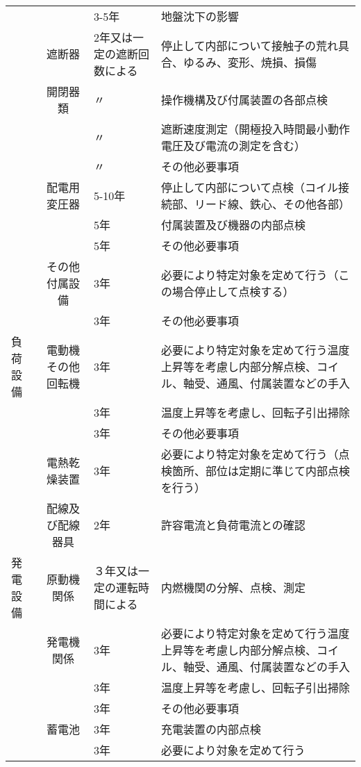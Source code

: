 \documentclass[10pt,a4paper,uplatex]{jsarticle}
\begin{document}
\begin{table}[b]
\begin{tabular}{|l|c|p{1cm}|p{10cm}|}
    &              & 3-5年 & 地盤沈下の影響  \\ \cline{2-4}
    &遮断器         & 2年又は一定の遮断回数による & 停止して内部について接触子の荒れ具合、ゆるみ、変形、焼損、損傷  \\ 
    &開閉器類       & 〃    & 操作機構及び付属装置の各部点検  \\
    &              & 〃    & 遮断速度測定（開極投入時間最小動作電圧及び電流の測定を含む）  \\
    &              & 〃    & その他必要事項  \\ \cline{2-4}
    &配電用変圧器   & 5-10年 & 停止して内部について点検（コイル接続部、リード線、鉄心、その他各部）  \\
    &              & 5年 & 付属装置及び機器の内部点検  \\ 
    &              & 5年 & その他必要事項  \\ \cline{2-4}
    &その他付属設備 & 3年 & 必要により特定対象を定めて行う（この場合停止して点検する）  \\
    &              & 3年 & その他必要事項  \\ \cline{2-4}
    \hline 
負荷設備
    &電動機その他回転機& 3年 & 必要により特定対象を定めて行う温度上昇等を考慮し内部分解点検、コイル、軸受、通風、付属装置などの手入  \\
    &              & 3年 & 温度上昇等を考慮し、回転子引出掃除  \\
    &              & 3年 & その他必要事項  \\ \cline{2-4}
    &電熱乾燥装置     & 3年 & 必要により特定対象を定めて行う（点検箇所、部位は定期に準じて内部点検を行う）  \\\cline{2-4}
    &配線及び配線器具   & 2年 & 許容電流と負荷電流との確認\\ \cline{2-4}
    \hline  
発電設備
    &原動機関係     & ３年又は一定の運転時間による & 内燃機関の分解、点検、測定  \\\cline{2-4}
    &発電機関係     & 3年 & 必要により特定対象を定めて行う温度上昇等を考慮し内部分解点検、コイル、軸受、通風、付属装置などの手入  \\
    &              & 3年 & 温度上昇等を考慮し、回転子引出掃除  \\
    &              & 3年 & その他必要事項  \\ \cline{2-4}
    &蓄電池         & 3年 & 充電装置の内部点検  \\
    &              & 3年 & 必要により対象を定めて行う\\\cline{2-4}\hline  
  \end{tabular}
\end{table}
\end{document}

